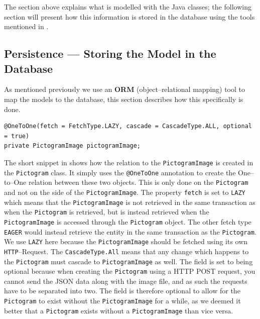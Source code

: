 \bigskip \noindent
The section above explains what is modelled with the Java classes; the following section will present how this information is stored in the database using the tools mentioned in .

\subsection{Persistence --- Storing the Model in the Database}\label{subsec:pictomodelstore}

As mentioned previously we use an \textbf{ORM} (object--relational mapping) tool to map the models to the database, this section describes how this specifically is done.

\begin{lstlisting}[caption={Fields with annotations which causes Hibernate to perform the ORM for a \texttt{PictogramImage}.},label={lst:PictoImage}]
@OneToOne(fetch = FetchType.LAZY, cascade = CascadeType.ALL, optional = true)
private PictogramImage pictogramImage;
\end{lstlisting}

The short snippet in  shows how the relation to the \texttt{PictogramImage} is created in the \texttt{Pictogram} class.
It simply uses the \texttt{@OneToOne} annotation to create the One--to--One relation between these two objects.
This is only done on the \texttt{Pictogram} and not on the side of the \texttt{PictogramImage}.
The property \texttt{fetch} is set to \texttt{LAZY} which means that the \texttt{PictogramImage} is not retrieved in the same transaction as when the \texttt{Pictogram} is retrieved, but is instead retrieved when the \texttt{PictogramImage} is accessed through the \texttt{Pictogram} object.
The other fetch type \texttt{EAGER} would instead retrieve the entity in the same transaction as the \texttt{Pictogram}.
We use \texttt{LAZY} here because the \texttt{PictogramImage} should be fetched using its own \texttt{HTTP}--Request.
The \texttt{CascadeType.All} means that any change which happens to the \texttt{Pictogram} must cascade to \texttt{PictogramImage} as well.
The field is set to being optional because when creating the \texttt{Pictogram} using a HTTP POST request, you cannot send the JSON data along with the image file, and as such the requests have to be separated into two.
The field is therefore optional to allow for the \texttt{Pictogram} to exist without the \texttt{PictogramImage} for a while, as we deemed it better that a \texttt{Pictogram} exists without a \texttt{PictogramImage} than vice versa.

